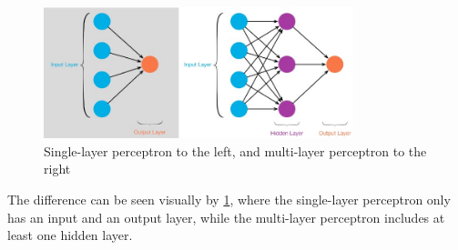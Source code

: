 \documentclass[USenglish]{ifimaster}  %
\begin{document}
\begin{figure}[H]
    \centering
    \includegraphics[width=0.8\textwidth]{bilder/slp_&_mlp.jpeg}
    \caption{Single-layer perceptron to the left, and multi-layer perceptron to the right \cite{website:slp_mlp}}
    \label{fig:slp_mlp}
\end{figure}
The difference can be seen visually by \cref{fig:slp_mlp}, where the single-layer perceptron only has an input and an output layer, while the multi-layer perceptron includes at least one hidden layer.
\newline
\newline
\end{document}
